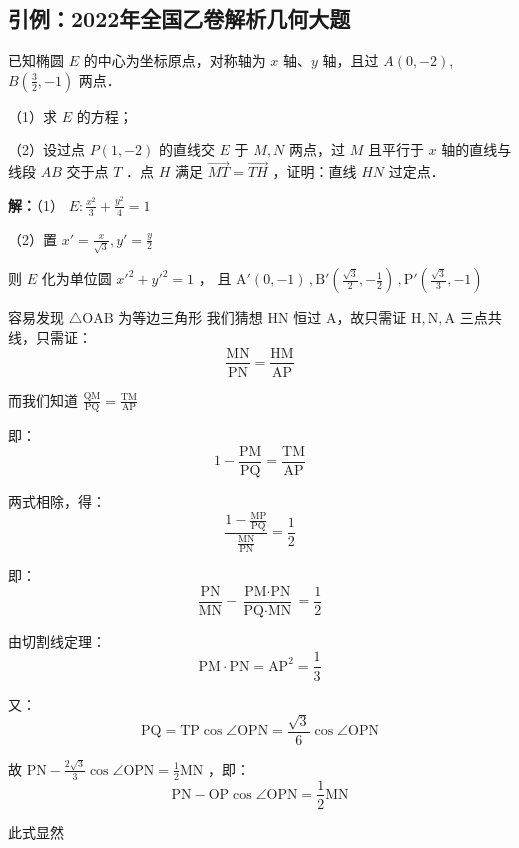 \subsection{引例：2022年全国乙卷解析几何大题}

已知椭圆 \(E\) 的中心为坐标原点，对称轴为 \(x\) 轴、\(y\) 轴，且过 \(A(0,-2)\),\(B(\frac{3}{2},-1)\) 两点．

（1）求 \(E\) 的方程；

（2）设过点 \(P(1,-2)\) 的直线交 \(E\) 于 \(M,N\) 两点，过 \(M\) 且平行于 \(x\) 轴的直线与线段 \(AB\) 交于点 \(T\) ．点 \(H\) 满足 \(\overrightarrow{MT}=\overrightarrow{TH}\) ，证明：直线 \(HN\) 过定点．

\textbf{解：}（1） \(E:\frac{x^2}{3}+\frac{y^2}{4}=1\)

（2）置 \(x'=\frac{x}{\sqrt{3}},y'=\frac{y}{2}\)

则 \(E\) 化为单位圆 \(x'^2+y'^2=1\) ， 且 \(\text{A}'(0,-1)\,,\text{B}'\left(\frac{\sqrt{3}}{2},-\frac{1}{2}\right)\,,\text{P}'\left(\frac{\sqrt{3}}{3},-1\right)\)

容易发现 \(\triangle \text{OAB}\) 为等边三角形
我们猜想 \(\text{HN}\) 恒过 \(\text{A}\)，故只需证 \(\text{H},\text{N},\text{A}\) 三点共线，只需证：
$$\frac{\text{MN}}{\text{PN}}=\frac{\text{HM}}{\text{AP}}$$

而我们知道 \(\frac{\text{QM}}{\text{PQ}}=\frac{\text{TM}}{\text{AP}}\) 

即：
$$1-\frac{\text{PM}}{\text{PQ}}=\frac{\text{TM}}{\text{AP}}$$

两式相除，得：
$$\frac{1-\frac{\text{MP}}{\text{PQ}}}{\frac{\text{MN}}{\text{PN}}}=\frac{1}{2}$$

即：
$$\frac{\text{PN}}{\text{MN}}-\frac{\text{PM}\cdot\text{PN}}{\text{PQ}\cdot\text{MN}}=\frac{1}{2}$$

由切割线定理：
$${\text{PM}}\cdot{\text{PN}}=\text{AP}^2=\frac{1}3$$

又：
$$\text{PQ}=\text{TP}\cos\angle\text{OPN}=\frac{\sqrt{3}}{6}\cos\angle\text{OPN}$$

故 \(\text{PN}-\frac{2\sqrt{3}}{3}\cos\angle\text{OPN}=\frac{1}{2}\text{MN}\) ，即：
$$\text{PN}-\text{OP}\cos\angle\text{OPN}=\frac{1}{2}\text{MN}$$

此式显然
